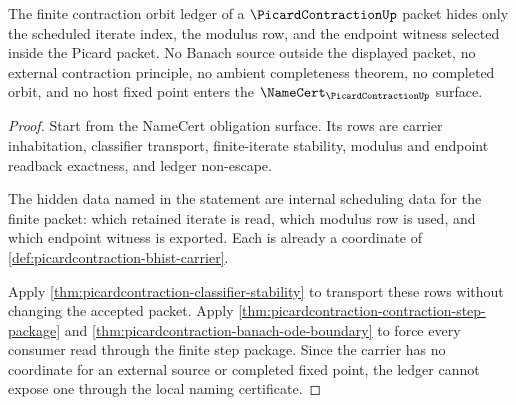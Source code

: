 \begin{theorem}
\label{thm:picardcontraction-fixed-point-ledger-boundary}
The finite contraction orbit ledger of a $\PicardContractionUp$ packet hides only the scheduled iterate index, the modulus row, and the endpoint witness selected inside the Picard packet. No Banach source outside the displayed packet, no external contraction principle, no ambient completeness theorem, no completed orbit, and no host fixed point enters the $\NameCert_{\PicardContractionUp}$ surface.
\end{theorem}
\begin{proof}
Start from the NameCert obligation surface. Its rows are carrier inhabitation, classifier transport, finite-iterate stability, modulus and endpoint readback exactness, and ledger non-escape.

The hidden data named in the statement are internal scheduling data for the finite packet: which retained iterate is read, which modulus row is used, and which endpoint witness is exported. Each is already a coordinate of \autoref{def:picardcontraction-bhist-carrier}.

Apply \autoref{thm:picardcontraction-classifier-stability} to transport these rows without changing the accepted packet. Apply \autoref{thm:picardcontraction-contraction-step-package} and \autoref{thm:picardcontraction-banach-ode-boundary} to force every consumer read through the finite step package. Since the carrier has no coordinate for an external source or completed fixed point, the ledger cannot expose one through the local naming certificate.
\end{proof}

